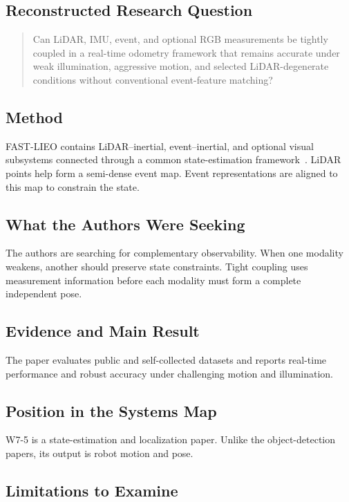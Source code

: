\subsection{Reconstructed Research Question}

\begin{quote}
Can LiDAR, IMU, event, and optional RGB measurements be tightly coupled in a real-time odometry framework that remains accurate under weak illumination, aggressive motion, and selected LiDAR-degenerate conditions without conventional event-feature matching?
\end{quote}

\subsection{Method}

FAST-LIEO contains LiDAR--inertial, event--inertial, and optional visual subsystems connected through a common state-estimation framework~\cite{wang2025fastlieo}. LiDAR points help form a semi-dense event map. Event representations are aligned to this map to constrain the state.

\subsection{What the Authors Were Seeking}

The authors are searching for complementary observability. When one modality weakens, another should preserve state constraints. Tight coupling uses measurement information before each modality must form a complete independent pose.

\subsection{Evidence and Main Result}

The paper evaluates public and self-collected datasets and reports real-time performance and robust accuracy under challenging motion and illumination.

\subsection{Position in the Systems Map}

W7-5 is a state-estimation and localization paper. Unlike the object-detection papers, its output is robot motion and pose.

\subsection{Limitations to Examine}

